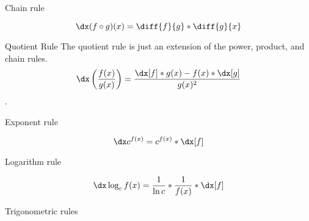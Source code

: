 \begin{psec}{Chain rule}\label{rule:derivative chain}

    \begin{equation}\label{eq:derivative chain}
        \dx (f \circ g)(x) = \diff{f}{g} * \diff{g}{x}
    \end{equation}

\end{psec}

\begin{psec}{Quotient Rule}\label{rule:derivative quotient} The quotient rule is just an extension of the
    power, product, and chain rules.
    \begin{equation}
        \dx \left(\frac{f(x)}{g(x)}\right) = \frac{\dx[f] * g(x) - f(x) * \dx[g]
        }{g(x)^2}
    \end{equation}.

\end{psec}

\begin{psec}{Exponent rule}\label{rule:derivative exponent}

    \begin{equation}
        \dx c ^ {f(x)} = c ^ {f(x)} * \dx[f]
    \end{equation}

\end{psec}

\begin{psec}{Logarithm rule}\label{rule:derivative log}

    \begin{equation}
        \dx \log_c f(x) = \frac{1}{\ln c} * \frac{1}{f(x)} * \dx[f]
    \end{equation}

\end{psec}


\begin{psec}{Trigonometric rules}


\end{psec}
